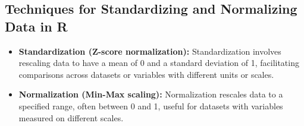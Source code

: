 \documentclass[
]{book}
\newenvironment{Shaded}{\begin{snugshade}}{\end{snugshade}}
\newcommand{\CommentTok}[1]{\textcolor[rgb]{0.56,0.35,0.01}{\textit{#1}}}
\newcommand{\ControlFlowTok}[1]{\textcolor[rgb]{0.13,0.29,0.53}{\textbf{#1}}}
\newcommand{\FunctionTok}[1]{\textcolor[rgb]{0.13,0.29,0.53}{\textbf{#1}}}
\newcommand{\NormalTok}[1]{#1}
\newcommand{\OtherTok}[1]{\textcolor[rgb]{0.56,0.35,0.01}{#1}}
\newcommand{\SpecialCharTok}[1]{\textcolor[rgb]{0.81,0.36,0.00}{\textbf{#1}}}
\providecommand{\tightlist}{%
  \setlength{\itemsep}{0pt}\setlength{\parskip}{0pt}}
\begin{document}
\hypertarget{techniques-for-standardizing-and-normalizing-data-in-r}{%
\subsection*{Techniques for Standardizing and Normalizing Data in R}\label{techniques-for-standardizing-and-normalizing-data-in-r}}

\begin{itemize}
\tightlist
\item
  \textbf{Standardization (Z-score normalization):} Standardization involves rescaling data to have a mean of 0 and a standard deviation of 1, facilitating comparisons across datasets or variables with different units or scales.
\end{itemize}

\begin{Shaded}
\end{Shaded}

\begin{itemize}
\tightlist
\item
  \textbf{Normalization (Min-Max scaling):} Normalization rescales data to a specified range, often between 0 and 1, useful for datasets with variables measured on different scales.
\end{itemize}

\begin{Shaded}
\end{Shaded}
\end{document}
